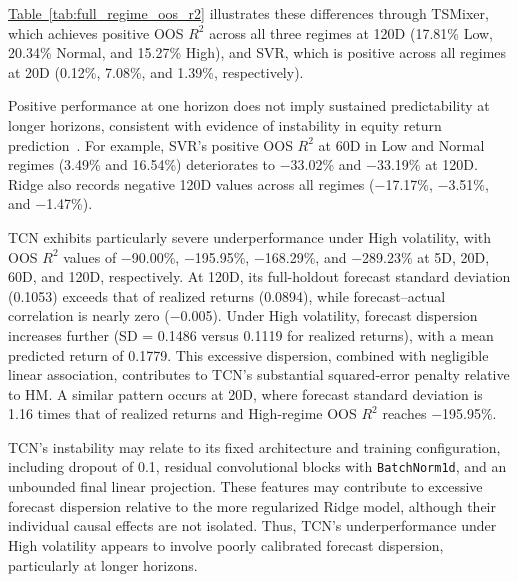 \documentclass[runningheads,orivec]{llncs}
\begin{document}
\hyperref[tab:full_regime_oos_r2]{Table~\ref*{tab:full_regime_oos_r2}} illustrates these differences through TSMixer, which achieves positive OOS $R^2$ across all three regimes at 120D (17.81\% Low, 20.34\% Normal, and 15.27\% High), and SVR, which is positive across all regimes at 20D (0.12\%, 7.08\%, and 1.39\%, respectively).

Positive performance at one horizon does not imply sustained predictability at longer horizons, consistent with evidence of instability in equity return prediction~\cite{harvey2021,paye2006}. For example, SVR's positive OOS $R^2$ at 60D in Low and Normal regimes (3.49\% and 16.54\%) deteriorates to $-$33.02\% and $-$33.19\% at 120D. Ridge also records negative 120D values across all regimes ($-$17.17\%, $-$3.51\%, and $-$1.47\%).

TCN exhibits particularly severe underperformance under High volatility, with OOS $R^2$ values of $-$90.00\%, $-$195.95\%, $-$168.29\%, and $-$289.23\% at 5D, 20D, 60D, and 120D, respectively. At 120D, its full-holdout forecast standard deviation (0.1053) exceeds that of realized returns (0.0894), while forecast--actual correlation is nearly zero ($-$0.005). Under High volatility, forecast dispersion increases further (SD = 0.1486 versus 0.1119 for realized returns), with a mean predicted return of 0.1779. This excessive dispersion, combined with negligible linear association, contributes to TCN's substantial squared-error penalty relative to HM. A similar pattern occurs at 20D, where forecast standard deviation is 1.16 times that of realized returns and High-regime OOS $R^2$ reaches $-$195.95\%.

TCN's instability may relate to its fixed architecture and training configuration, including dropout of 0.1, residual convolutional blocks with \texttt{BatchNorm1d}, and an unbounded final linear projection. These features may contribute to excessive forecast dispersion relative to the more regularized Ridge model, although their individual causal effects are not isolated. Thus, TCN's underperformance under High volatility appears to involve poorly calibrated forecast dispersion, particularly at longer horizons.
\end{document}
